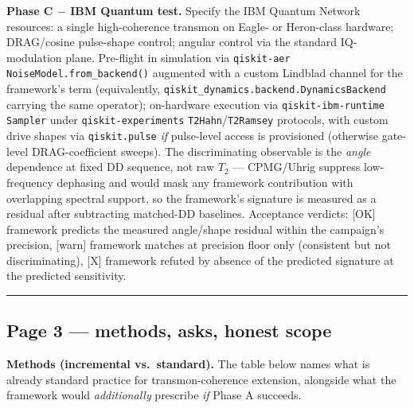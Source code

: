 \documentclass[
  11pt,
]{article}
\begin{document}
\textbf{Phase C \(-\) IBM Quantum test.} Specify the IBM Quantum Network
resources: a single high-coherence transmon on Eagle- or Heron-class
hardware; DRAG/cosine pulse-shape control; angular control via the
standard IQ-modulation plane. Pre-flight in simulation via
\texttt{qiskit-aer} \texttt{NoiseModel.from\_backend()} augmented with a
custom Lindblad channel for the framework's term (equivalently,
\texttt{qiskit\_dynamics.backend.DynamicsBackend} carrying the same
operator); on-hardware execution via \texttt{qiskit-ibm-runtime}
\texttt{Sampler} under \texttt{qiskit-experiments}
\texttt{T2Hahn}/\texttt{T2Ramsey} protocols, with custom drive shapes
via \texttt{qiskit.pulse} \emph{if} pulse-level access is provisioned
(otherwise gate-level DRAG-coefficient sweeps). The discriminating
observable is the \emph{angle} dependence at fixed DD sequence, not raw
\(T_2\) --- CPMG/Uhrig suppress low-frequency dephasing and would mask
any framework contribution with overlapping spectral support, so the
framework's signature is measured as a residual after subtracting
matched-DD baselines. Acceptance verdicts: {[}OK{]} framework predicts
the measured angle/shape residual within the campaign's precision,
{[}warn{]} framework matches at precision floor only (consistent but not
discriminating), {[}X{]} framework refuted by absence of the predicted
signature at the predicted sensitivity.

\begin{center}\rule{0.5\linewidth}{0.5pt}\end{center}

\hypertarget{page-3-methods-asks-honest-scope}{%
\subsection{Page 3 --- methods, asks, honest
scope}\label{page-3-methods-asks-honest-scope}}

\textbf{Methods (incremental vs.~standard).} The table below names what
is already standard practice for transmon-coherence extension, alongside
what the framework would \emph{additionally} prescribe \emph{if} Phase A
succeeds.
\end{document}
